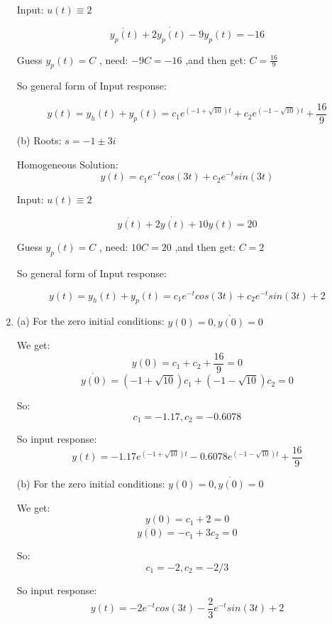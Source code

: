 \documentclass[12pt]{article}
\begin{document}
\begin{enumerate}[label=\roman*.]
        Input: $u(t) \equiv 2$

        \[\ddot{y_p(t)} + 2\dot{y_p(t)} - 9y_p(t) = -16\]

        Guess $y_p(t) = C$ , need: $-9C = -16$ ,and then get: $C = \frac{16}{9}$

        So general form of Input response:

        \[y(t) = y_h(t) + y_p(t) = c_1e^{(-1+\sqrt{10})t} + c_2e^{(-1-\sqrt{10})t} + 
            \frac{16}{9}\]

        (b)
        Roots: $s = -1 \pm 3i$

        Homogeneous Solution: 
        \[y(t) = c_1e^{-t}cos(3t) + c_2e^{-t}sin(3t)\]

        Input: $u(t) \equiv 2$

        \[\ddot{y(t)} + 2\dot{y(t)} + 10y(t) = 20\]

        Guess $y_p(t) = C$ , need: $10C = 20$ ,and then get: $C = 2$

        So general form of Input response:

        \[y(t) = y_h(t) + y_p(t) = c_1e^{-t}cos(3t) + c_2e^{-t}sin(3t) + 2\]

        \item (a)
        For the zero initial conditions: $y(0) = 0, \dot{y(0)} = 0$

        We get:
        \[y(0) = c_1 + c_2 + \frac{16}{9} = 0\]
        \[\dot{y(0)} = (-1+\sqrt{10})c_1 + (-1-\sqrt{10})c_2 = 0\]

        So:
        \[c_1 = -1.17, c_2 = -0.6078\]

        So input response:
        \[y(t) = -1.17e^{(-1+\sqrt{10})t} -0.6078e^{(-1-\sqrt{10})t} + 
            \frac{16}{9}\]


        (b)
        For the zero initial conditions: $y(0) = 0, \dot{y(0)} = 0$

        We get:
        \[y(0) = c_1 + 2 = 0\]
        \[\dot{y(0)} = -c_1 + 3c_2 = 0\]

        So:
        \[c_1 = -2, c_2 = -2/3\]

        So input response:
        \[y(t) = -2e^{-t}cos(3t) - \frac{2}{3}e^{-t}sin(3t) + 2\]


    \end{enumerate}
\end{document}
